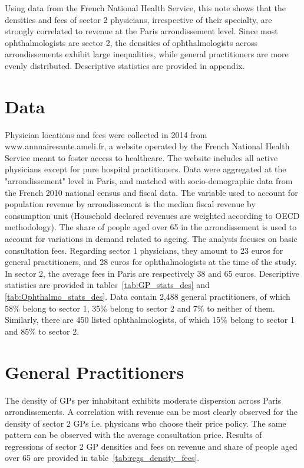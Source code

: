 \documentclass[11pt]{article}
\begin{document}
Using data from the French National Health Service, this note shows that the densities and fees of sector 2 physicians, irrespective of their specialty, are strongly correlated to revenue at the Paris arrondissement level. Since most ophthalmologists are sector 2, the densities of ophthalmologists across arrondissements exhibit large inequalities, while general practitioners are more evenly distributed. Descriptive statistics are provided in appendix.

\section{Data}

Physician locations and fees were collected in 2014 from www.annuairesante.ameli.fr, a website operated by the French National Health Service meant to foster access to healthcare. The website includes all active physicians except for pure hospital practitioners. Data were aggregated at the "arrondissement" level in Paris, and matched with socio-demographic data from the French 2010 national census and fiscal data. The variable used to account for population revenue by arrondissement is the median fiscal revenue by consumption unit (Household declared revenues are weighted according to OECD methodology). The share of people aged over 65 in the arrondissement is used to account for variations in demand related to ageing. The analysis focuses on basic consultation fees. Regarding sector 1 physicians, they amount to 23 euros for general practitioners, and 28 euros for ophthalmologists at the time of the study. In sector 2, the average fees in Paris are respectively 38 and 65 euros. Descriptive statistics are provided in tables~\ref{tab:GP_stats_des} and \ref{tab:Ophthalmo_stats_des}. Data contain 2,488 general practitioners, of which 58\% belong to sector 1, 35\% belong to sector 2 and 7\% to neither of them. Similarly, there are 450 listed ophthalmologists, of which 15\% belong to sector 1 and 85\% to sector 2.

\section{General Practitioners}

The density of GPs per inhabitant exhibits moderate dispersion across Paris arrondissements. A correlation with revenue can be most clearly observed for the density of sector 2 GPs i.e. physicans who choose their price policy. The same pattern can be observed with the average consultation price. Results of regressions of sector 2 GP densities and fees on revenue and share of people aged over 65 are provided in table~\ref{tab:regs_density_fees}.
\end{document}
